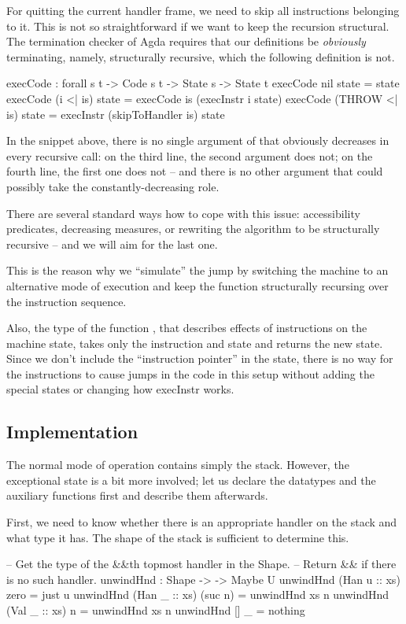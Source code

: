 For quitting the current handler frame, we need to skip all instructions
belonging to it. This is not so straightforward if we want to keep the
recursion structural. The termination checker of Agda requires that our
definitions be \emph{obviously} terminating, namely, structurally recursive,
which the following definition is not.
\begin{code}
  execCode : forall {s t} -> Code s t -> State s -> State t
  execCode nil state = state
  execCode (i <| is) state = execCode is (execInstr i state)
  execCode (THROW <| is) state = execInstr (skipToHandler is) state
\end{code}
In the snippet above, there is no single argument of  that
obviously decreases in every recursive call: on the third line, the second
argument does not; on the fourth line, the first one does not -- and there
is no other argument that could possibly take the constantly-decreasing role.

There are several standard ways how to cope with this issue: accessibility
predicates, decreasing measures, or rewriting the algorithm to be
structurally recursive -- and we will aim for the last one.

This is the reason why we ``simulate'' the jump by switching the machine to an
alternative mode of execution and keep the function 
structurally recursing over the instruction sequence.

Also, the type of the function , that describes effects of
instructions on the machine state, takes only the instruction and state and
returns the new state. Since we don't include the ``instruction pointer'' in
the state, there is no way for the instructions to cause jumps in the code in
this setup without adding the special states or changing how execInstr works.


\subsection{Implementation}

The normal mode of operation contains simply the stack. However, the exceptional state
is a bit more involved; let us declare the datatypes and the auxiliary functions first
and describe them afterwards.

First, we need to know whether there is an appropriate handler on the stack and what type
it has. The shape of the stack is sufficient to determine this.
\begin{code}
  -- Get the type of the &&\-th top\-most handler in the Shape.
  -- Return && if there is no such handler.
  unwindHnd : Shape -> \bN -> Maybe U
  unwindHnd (Han u :: xs) zero    = just u
  unwindHnd (Han _ :: xs) (suc n) = unwindHnd xs n
  unwindHnd (Val _ :: xs) n       = unwindHnd xs n
  unwindHnd []           _       = nothing
\end{code}

